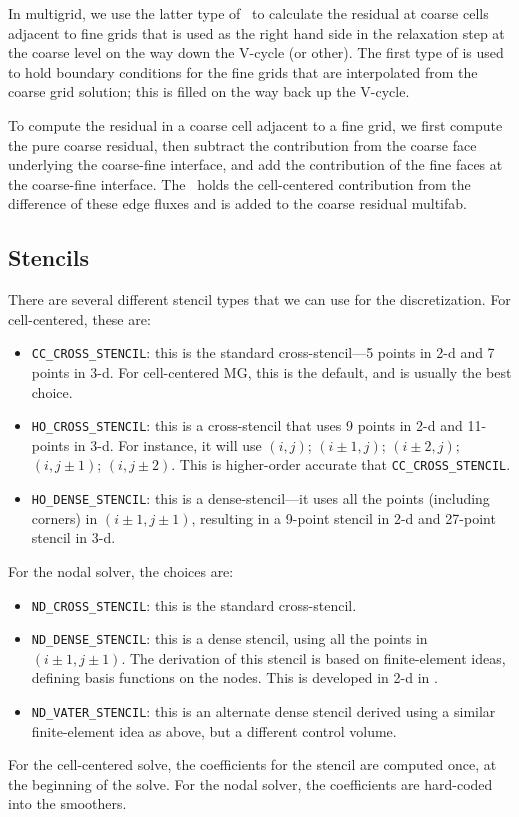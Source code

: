 In multigrid, we use the latter type of \bndryreg\ to calculate the 
residual at coarse cells adjacent to fine grids that is used as the right hand side
in the relaxation step at the coarse level on the way down the V-cycle (or other).  
The first type of \bndryreg is used to hold boundary conditions for the fine grids 
that are interpolated from the coarse grid solution; this is filled on the way back up the V-cycle.

To compute the residual in a coarse cell adjacent to a fine grid, we first
compute the pure coarse residual, then subtract the contribution from the coarse
face underlying the coarse-fine interface, and add the contribution of the fine
faces at the coarse-fine interface.  The \bndryreg\ holds the cell-centered
contribution from the difference of these edge fluxes and is added to
the coarse residual multifab.

\subsection{Stencils}

There are several different stencil types that we can use for 
the discretization.  For cell-centered, these are:
\begin{itemize}
\item {\tt CC\_CROSS\_STENCIL}: this is the standard cross-stencil---5 points 
in 2-d and 7 points in 3-d.  For cell-centered MG, this is the default, and
is usually the best choice.

\item {\tt HO\_CROSS\_STENCIL}: this is a cross-stencil that uses 9 points
in 2-d and 11-points in 3-d.  For instance, it will use $(i,j)$;
$(i\pm1,j)$; $(i\pm2,j)$; $(i,j\pm1)$; $(i,j\pm2)$.  This is
higher-order accurate that {\tt CC\_CROSS\_STENCIL}.

\item {\tt HO\_DENSE\_STENCIL}: this is a dense-stencil---it uses all the
points (including corners) in $(i\pm1,j\pm1)$, resulting in a 9-point stencil
in 2-d and 27-point stencil in 3-d.
\end{itemize}

For the nodal solver, the choices are:
\begin{itemize}
\item {\tt ND\_CROSS\_STENCIL}: this is the standard cross-stencil.

\item {\tt ND\_DENSE\_STENCIL}: this is a dense stencil, using
  all the points in $(i\pm1,j\pm1)$.  The 
  derivation of this stencil is based on finite-element ideas, defining
  basis functions on the nodes.  This is developed in 2-d in 
  \cite{almgrenBellSzymczak:1996}.

\item {\tt ND\_VATER\_STENCIL}: this is an alternate dense stencil derived
  using a similar finite-element idea as above, but a different control
  volume.
\end{itemize}
For the cell-centered solve, the coefficients for the stencil are computed
once, at the beginning of the solve.  For the nodal solver, the coefficients
are hard-coded into the smoothers.


